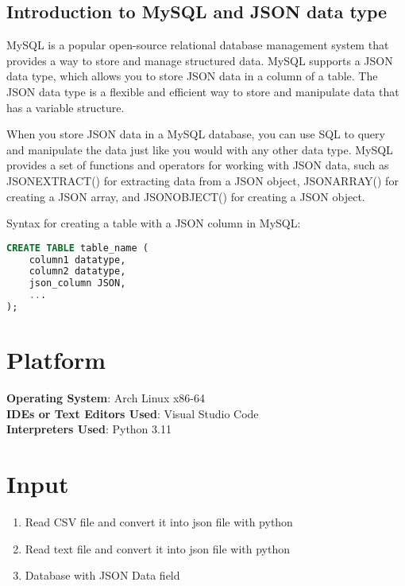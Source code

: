 \documentclass[11pt]{article}
\begin{document}
\subsection{Introduction to MySQL and JSON data type}

MySQL is a popular open-source relational database management system that provides a way to store and manage structured data. MySQL supports a JSON data type, which allows you to store JSON data in a column of a table. The JSON data type is a flexible and efficient way to store and manipulate data that has a variable structure.

When you store JSON data in a MySQL database, you can use SQL to query and manipulate the data just like you would with any other data type. MySQL provides a set of functions and operators for working with JSON data, such as JSONEXTRACT() for extracting data from a JSON object, JSONARRAY() for creating a JSON array, and JSONOBJECT() for creating a JSON object.

Syntax for creating a table with a JSON column in MySQL:

\begin{lstlisting}[language=sql]
CREATE TABLE table_name (
    column1 datatype,
    column2 datatype,
    json_column JSON,
    ...
);    

\end{lstlisting}
\section{Platform}
\textbf{Operating System}: Arch Linux x86-64 \\
\textbf{IDEs or Text Editors Used}: Visual Studio Code \\
\textbf{Interpreters Used}: Python 3.11\\


\section{Input}
\begin{enumerate}
    \item Read CSV file and convert it into json file with python
    \item Read text file and convert it into json file with python
    \item Database with JSON Data field
\end{enumerate}
\end{document}

